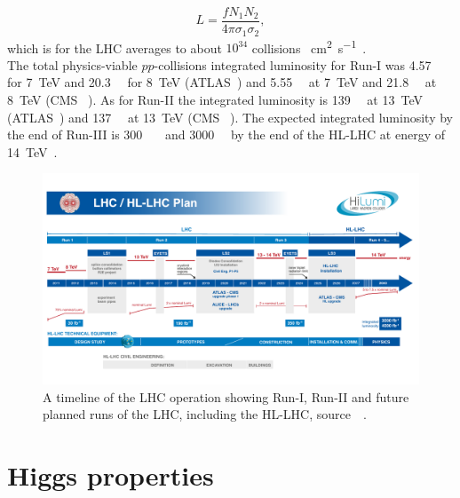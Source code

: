 \begin{equation}
	L = \frac{f N_1 N_2}{4 \pi  \sigma_1 \sigma_2},
\end{equation}
which is for the LHC averages to about $ 10^{34}$ collisions \si{\per \centi\metre\squared \per \second}~\cite{closer,lhcpreformance}.  \\ The total physics-viable $pp$-collisions  integrated luminosity for Run-I was \SI{4.57}{\per \femtobarn} for \SI{7}{\tera\electronvolt} and \SI{20.3}{\per \femtobarn} for \SI{8}{\tera\electronvolt} (ATLAS~\cite{atlaslumi1}) and  \SI{5.55}{\per \femtobarn} at \SI{7}{\tera\electronvolt} and \SI{21.8}{\per \femtobarn} at \SI{8}{\tera\electronvolt} (CMS ~\cite{cmslumi}). As for Run-II the integrated luminosity is \SI{139}{\per \femtobarn} at \SI{13}{\tera\electronvolt } (ATLAS~\cite{atlaslumi2})  and \SI{137}{\per \femtobarn} at \SI{13}{\tera\electronvolt } (CMS ~\cite{cmslumi}). The expected integrated luminosity by the end of Run-III is  \SI{300}{\per \femtobarn}~\cite{Fartoukh:2790409} and \SI{3000}{\per \femtobarn} by the end of the HL-LHC at energy of \SI{14}{\tera\electronvolt }~\cite{Apollinari:2015bam}. 
\begin{figure}[htbp!]
	\centering
		\includegraphics[width=\textwidth]{figures/HL-LHC-plan-2021-1}
	\caption{ A timeline of the LHC operation showing Run-I, Run-II and future planned runs of the LHC, including the HL-LHC, source~~\cite{lhckomission}. 
	}
\label{fig:lhcplan}
\end{figure}
\section{Higgs properties \label{sec:Higgsprop} }
